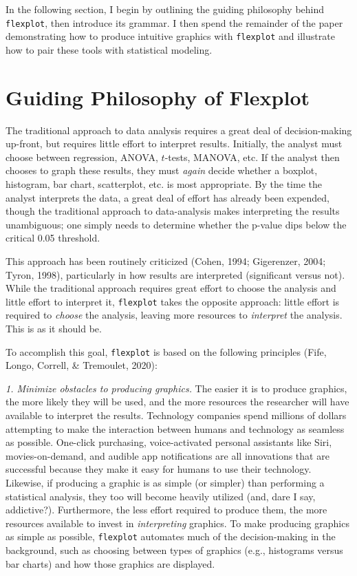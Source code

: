\documentclass[
  english,
  man]{apa6}
\begin{document}
In the following section, I begin by outlining the guiding philosophy behind \texttt{flexplot}, then introduce its grammar. I then spend the remainder of the paper demonstrating how to produce intuitive graphics with \texttt{flexplot} and illustrate how to pair these tools with statistical modeling.

\hypertarget{guiding-philosophy-of-flexplot}{%
\section{Guiding Philosophy of Flexplot}\label{guiding-philosophy-of-flexplot}}

The traditional approach to data analysis requires a great deal of decision-making up-front, but requires little effort to interpret results. Initially, the analyst must choose between regression, ANOVA, \(t\)-tests, MANOVA, etc. If the analyst then chooses to graph these results, they must \emph{again} decide whether a boxplot, histogram, bar chart, scatterplot, etc. is most appropriate. By the time the analyst interprets the data, a great deal of effort has already been expended, though the traditional approach to data-analysis makes interpreting the results unambiguous; one simply needs to determine whether the p-value dips below the critical 0.05 threshold.

This approach has been routinely criticized (Cohen, 1994; Gigerenzer, 2004; Tyron, 1998), particularly in how results are interpreted (significant versus not). While the traditional approach requires great effort to choose the analysis and little effort to interpret it, \texttt{flexplot} takes the opposite approach: little effort is required to \emph{choose} the analysis, leaving more resources to \emph{interpret} the analysis. This is as it should be.

To accomplish this goal, \texttt{flexplot} is based on the following principles (Fife, Longo, Correll, \& Tremoulet, 2020):

\emph{1. Minimize obstacles to producing graphics.} The easier it is to produce graphics, the more likely they will be used, and the more resources the researcher will have available to interpret the results. Technology companies spend millions of dollars attempting to make the interaction between humans and technology as seamless as possible. One-click purchasing, voice-activated personal assistants like Siri, movies-on-demand, and audible app notifications are all innovations that are successful because they make it easy for humans to use their technology. Likewise, if producing a graphic is as simple (or simpler) than performing a statistical analysis, they too will become heavily utilized (and, dare I say, addictive?). Furthermore, the less effort required to produce them, the more resources available to invest in \emph{interpreting} graphics. To make producing graphics as simple as possible, \texttt{flexplot} automates much of the decision-making in the background, such as choosing between types of graphics (e.g., histograms versus bar charts) and how those graphics are displayed.
\end{document}
